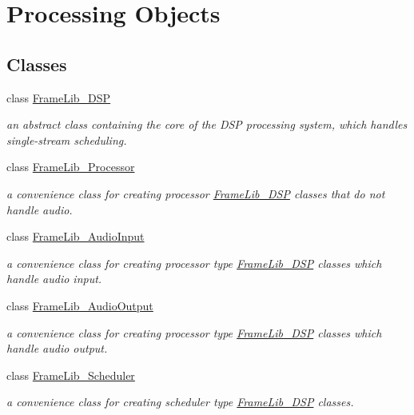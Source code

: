 \hypertarget{group___d_s_p}{}\section{Processing Objects}
\label{group___d_s_p}
\subsection*{Classes}
\begin{DoxyCompactItemize}
\item 
class \hyperlink{class_frame_lib___d_s_p}{Frame\+Lib\+\_\+\+D\+SP}
\begin{DoxyCompactList}\small\item\em an abstract class containing the core of the D\+SP processing system, which handles single-\/stream scheduling. \end{DoxyCompactList}\item 
class \hyperlink{class_frame_lib___processor}{Frame\+Lib\+\_\+\+Processor}
\begin{DoxyCompactList}\small\item\em a convenience class for creating processor \hyperlink{class_frame_lib___d_s_p}{Frame\+Lib\+\_\+\+D\+SP} classes that do not handle audio. \end{DoxyCompactList}\item 
class \hyperlink{class_frame_lib___audio_input}{Frame\+Lib\+\_\+\+Audio\+Input}
\begin{DoxyCompactList}\small\item\em a convenience class for creating processor type \hyperlink{class_frame_lib___d_s_p}{Frame\+Lib\+\_\+\+D\+SP} classes which handle audio input. \end{DoxyCompactList}\item 
class \hyperlink{class_frame_lib___audio_output}{Frame\+Lib\+\_\+\+Audio\+Output}
\begin{DoxyCompactList}\small\item\em a convenience class for creating processor type \hyperlink{class_frame_lib___d_s_p}{Frame\+Lib\+\_\+\+D\+SP} classes which handle audio output. \end{DoxyCompactList}\item 
class \hyperlink{class_frame_lib___scheduler}{Frame\+Lib\+\_\+\+Scheduler}
\begin{DoxyCompactList}\small\item\em a convenience class for creating scheduler type \hyperlink{class_frame_lib___d_s_p}{Frame\+Lib\+\_\+\+D\+SP} classes. \end{DoxyCompactList}\item 

\end{DoxyCompactItemize}
